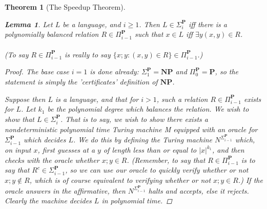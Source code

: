 \documentclass{article}
\theoremstyle{definition}
\theoremstyle{plain}
\theoremstyle{theorem}
\newtheorem{lemma}{Lemma}[section]
\newtheorem{theorem}{Theorem}[section]
\begin{document}
\begin{theorem}[The Speedup Theorem]
\begin{lemma}
    Let $L$ be a language, and $i \geq 1$. Then $L \in \Sigma_i^{\textbf{P}}$ iff there is a polynomially balanced relation $R \in \Pi_{i-1}^{\textbf{P}}$ such that $x \in L$ iff $\exists y (x,y) \in R$. \\
    \\
    (To say $R \in \Pi_{i-1}^{\textbf{P}}$ is really to say $\{x;y: (x,y) \in R\} \in \Pi_{i-1}^{\textbf{P}}$.)
\end{lemma}
\begin{proof}
    The base case $i=1$ is done already: $\Sigma_1^{\textbf{P}} = \textbf{NP}$ and $\Pi_0^{\textbf{P}} = \textbf{P}$, so the statement is simply the 'certificates' definition of $\textbf{NP}$.
    \par Suppose then $L$ is a language, and that for $i > 1$, such a relation $R \in \Pi_{i-1}^{\textbf{P}}$ exists for $L$. Let $k_1$ be the polynomial degree which balances the relation. We wish to show that $L \in \Sigma_i^{\textbf{P}}$. That is to say, we wish to show there exists a nondeterministic polynomial time Turing machine M equipped with an oracle for $\Sigma_{i-1}^{\textbf{P}}$ which decides $L$. We do this by defining the Turing machine $N^{\Sigma_{i-1}^{\textbf{P}}}$ which, on input $x$, first guesses at a $y$ of length less than or equal to $|x|^{k_1}$, and then checks with the oracle whether $x;y \in R$. (Remember, to say that $R \in \Pi_{i-1}^{\textbf{P}}$ is to say that $R^c \in \Sigma_{i-1}^{\textbf{P}}$, so we can use our oracle to quickly verify whether or not $x;y \notin R$, which is of course equivalent to verifying whether or not $x;y \in R$.) If the oracle answers in the affirmative, then $N^{\Sigma_{i-1}^{\textbf{P}}}$ halts and accepts, else it rejects. Clearly the machine decides $L$ in polynomial time.

\end{proof}
\end{theorem}
\end{document}
